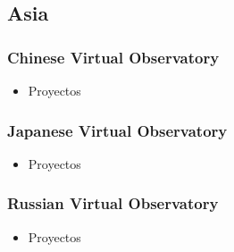 \subsection{Asia}
\subsubsection{Chinese Virtual Observatory}
	\begin{itemize}
		\item Proyectos
	\end{itemize}

\subsubsection{Japanese Virtual Observatory}
	\begin{itemize}
		\item Proyectos
	\end{itemize}

\subsubsection{Russian Virtual Observatory}
	\begin{itemize}
		\item Proyectos
	\end{itemize}

